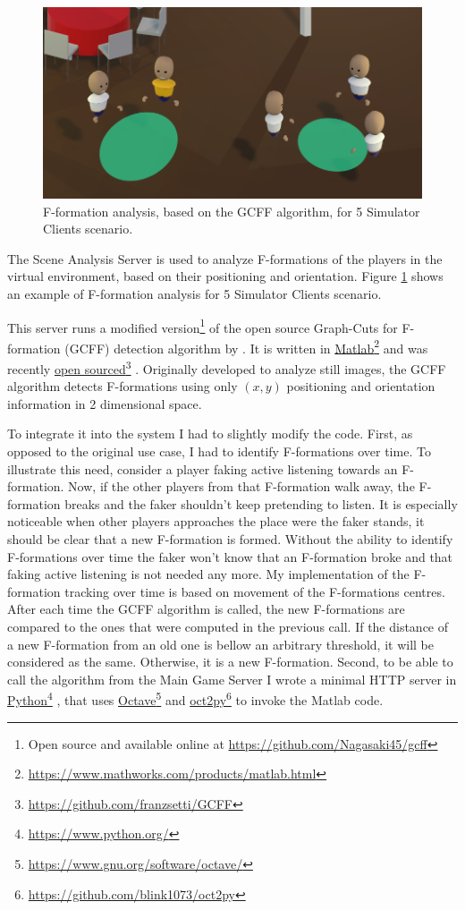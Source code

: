 \documentclass[]{simple-thesis}
\newcommand\fnurl[2]{%
  \href{#2}{#1}\footnote{\url{#2}}%
}
\begin{document}
\begin{figure}
  \centering
  \includegraphics[width=\textwidth]{../graphics/simulator_f_formation.png}
  \caption{F-formation analysis, based on the GCFF algorithm, for 5 Simulator Clients scenario.}
  \label{fig:system:simulator_f_formation}
\end{figure}

The Scene Analysis Server is used to analyze F-formations of the players in the virtual environment, based on their positioning and orientation.
Figure \ref{fig:system:simulator_f_formation} shows an example of F-formation analysis for 5 Simulator Clients scenario.

This server runs a modified version\footnote{Open source and available online at \url{https://github.com/Nagasaki45/gcff}} of the open source Graph-Cuts for F-formation (GCFF) detection algorithm by \cite{Setti2015}.
It is written in \fnurl{Matlab}{https://www.mathworks.com/products/matlab.html} and was recently \fnurl{open sourced}{https://github.com/franzsetti/GCFF}.
Originally developed to analyze still images, the GCFF algorithm detects F-formations using only $(x, y)$ positioning and orientation information in 2 dimensional space.

To integrate it into the system I had to slightly modify the code.
First, as opposed to the original use case, I had to identify F-formations over time.
To illustrate this need, consider a player faking active listening towards an F-formation.
Now, if the other players from that F-formation walk away, the F-formation breaks and the faker shouldn't keep pretending to listen.
It is especially noticeable when other players approaches the place were the faker stands, it should be clear that a new F-formation is formed.
Without the ability to identify F-formations over time the faker won't know that an F-formation broke and that faking active listening is not needed any more.
My implementation of the F-formation tracking over time is based on movement of the F-formations centres.
After each time the GCFF algorithm is called, the new F-formations are compared to the ones that were computed in the previous call.
If the distance of a new F-formation from an old one is bellow an arbitrary threshold, it will be considered as the same.
Otherwise, it is a new F-formation.
Second, to be able to call the algorithm from the Main Game Server I wrote a minimal HTTP server in \fnurl{Python}{https://www.python.org/}, that uses \fnurl{Octave}{https://www.gnu.org/software/octave/} and \fnurl{oct2py}{https://github.com/blink1073/oct2py} to invoke the Matlab code.
\end{document}

